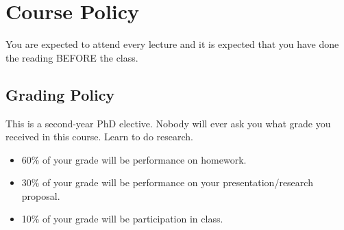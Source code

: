 \documentclass[11pt]{article}
\begin{document}
\section*{Course Policy}
You are expected to attend every lecture and it is expected that you have done the reading BEFORE the class.
\subsection*{Grading Policy}
This is a second-year PhD elective. Nobody will ever ask you what grade you received in this course. Learn to do research.
\begin{itemize}
\item 60\% of your grade will be performance on homework.
\item 30\% of your grade will be performance on your presentation/research proposal.
\item 10\% of your grade will be participation in class.
\end{itemize}
\end{document}
